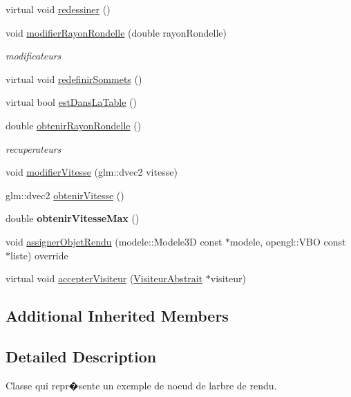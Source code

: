 \begin{DoxyCompactItemize}
virtual void \hyperlink{group__inf2990_gaeb5a41b6e3b23d634caafc9c9e2ff6fd}{redessiner} ()
\item 
void \hyperlink{group__inf2990_ga7a7dea6fa17b186ff6e619b2e8b29bd8}{modifier\+Rayon\+Rondelle} (double rayon\+Rondelle)
\begin{DoxyCompactList}\small\item\em modificateurs \end{DoxyCompactList}\item 
virtual void \hyperlink{group__inf2990_ga05a7e3f48f1e321e9cf6cf8600b73701}{redefinir\+Sommets} ()
\item 
virtual bool \hyperlink{group__inf2990_gaf1459d2eaaf4c312fe5111455c1adb52}{est\+Dans\+La\+Table} ()
\item 
double \hyperlink{group__inf2990_ga514eb45118a873e6516557a25f31eb62}{obtenir\+Rayon\+Rondelle} ()
\begin{DoxyCompactList}\small\item\em recuperateurs \end{DoxyCompactList}\item 
void \hyperlink{group__inf2990_ga98de58c361ce7fc0cae2c5097dcbc6d4}{modifier\+Vitesse} (glm\+::dvec2 vitesse)
\item 
glm\+::dvec2 \hyperlink{group__inf2990_ga49a559d3a16abc15e87cb320e20f2124}{obtenir\+Vitesse} ()
\item 
\hypertarget{class_noeud_rondelle_a713ef6e0c2adf2e293d15b31ddcd436e}{}\label{class_noeud_rondelle_a713ef6e0c2adf2e293d15b31ddcd436e} 
double {\bfseries obtenir\+Vitesse\+Max} ()
\item 
void \hyperlink{group__inf2990_ga6806c8f683c987319ee74f3bea86124f}{assigner\+Objet\+Rendu} (modele\+::\+Modele3D const $\ast$modele, opengl\+::\+V\+BO const $\ast$liste) override
\item 
virtual void \hyperlink{group__inf2990_gac9e330d1fe7f2413474785b4f2280db5}{accepter\+Visiteur} (\hyperlink{class_visiteur_abstrait}{Visiteur\+Abstrait} $\ast$visiteur)
\end{DoxyCompactItemize}
\subsection*{Additional Inherited Members}


\subsection{Detailed Description}
Classe qui repr�sente un exemple de noeud de l\textquotesingle{}arbre de rendu. 

